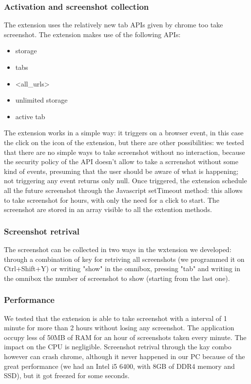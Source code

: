 \documentclass[12pt]{article}
\begin{document}
\begin{multicols}{2}
\subsubsection*{Activation and screenshot collection}
The extension uses the relatively new tab APIs given by chrome too take screenshot.
The extension makes use of the following APIs:\begin{itemize}
	\item storage
	\item tabs
	\item <all\_urls>
	\item unlimited storage
	\item active tab
	\end{itemize}
	 The extension works in a simple way: it triggers on a browser event, in this case the click on the icon of the extension, but there are other possibilities: we tested that there are no simple ways to take screenshot without no interaction, because the security policy of the API doesn't allow to take a scrrenshot without some kind of events, presuming that the user should be aware of what is happening; not triggering any event returns only null.
Once triggered, the extension schedule all the future screenshot through the Javascript setTimeout method: this allows to take screenshot for hours, with only the need for a click to start.
The screenshot are stored in an array visible to all the extention methods.
\subsubsection*{Screenshot retrival}
The screenshot can be collected in two ways in the wxtension we developed:
through a combination of key for retriving all screenshots (we programmed it on Ctrl+Shift+Y) or writing "show" in the omnibox, pressing "tab" and writing in the omnibox the number of screenshot to show (starting from the last one).
\subsubsection*{Performance}
We tested that the extension is able to take screenshot with a interval of 1 minute for more than 2 hours without losing any screenshot.
The application occupy less of 50MB of RAM for an hour of screenshots taken every minute. The impact on the CPU is negligible.
Screenshot retrival through the kay combo however can  crash chrome, although it never happened in our PC because of the great performance (we had an Intel i5 6400, with 8GB of DDR4 memory and SSD), but it got freezed for some seconds.

\end{multicols}
\end{document}
